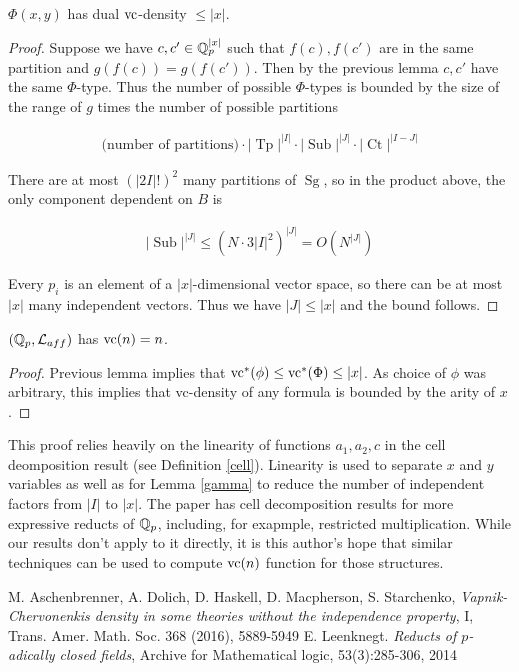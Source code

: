 \documentclass{amsart}
\renewcommand{\LL}{\mathcal L}
\newcommand{\paren}[1]{\left(#1\right)}
\DeclareMathOperator{\Sg}{Sg}
\DeclareMathOperator{\It}{Tp}
\DeclareMathOperator{\Sub}{Sub}
\DeclareMathOperator{\Ct}{Ct}
\begin{document}
\begin{Corollary}
  $\Phi(x,y)$ has dual $\operatorname{vc}$-density $\leq |x|$.
\end{Corollary}

\begin{proof}
  Suppose we have $c, c' \in \mathbb{Q}_p^{|x|}$ such that $f(c), f(c')$ are in the same partition and $g(f(c)) = g(f(c'))$.
  Then by the previous lemma $c, c'$ have the same $\Phi$-type.
  Thus the number of possible $\Phi$-types is bounded by the size of the range of $g$ times the number of possible partitions
  
  \begin{align*}
    \text{(number of partitions)} \cdot |\It|^{|I|} \cdot |\Sub|^{|J|} \cdot |\Ct|^{|I-J|}
  \end{align*}

  There are at most $\paren{|2I|!}^2$ many partitions of $\Sg$,
  so in the product above, the only component dependent on $B$ is

  \begin{align*}
    |\Sub|^{|J|} \leq (N \cdot 3{|I|}^2)^{|J|} = O(N^{|J|})
  \end{align*}	
  
  Every $p_i$ is an element of a $|x|$-dimensional vector space, so there can be at most $|x|$ many independent vectors.
  Thus we have $|J| \leq |x|$ and the bound follows.
\end{proof}

\begin{Corollary} 
  $(\Q_p, \LL_{aff})$ has $\operatorname{vc}(n) = n$.
\end{Corollary}

\begin{proof}
  Previous lemma implies that $\operatorname{vc}^*(\phi) \leq \operatorname{vc}^*(\Phi) \leq |x|$.
  As choice of $\phi$ was arbitrary, this implies that vc-density of any formula is bounded by the arity of $x$.
\end{proof}

This proof relies heavily on the linearity of functions $a_1, a_2, c$ in the cell deomposition result (see Definition \ref{cell}).
Linearity is used to separate $x$ and $y$ variables as well as
for Lemma \ref{gamma} to reduce the number of independent factors from $|I|$ to $|x|$.
The paper \cite{reduct} has cell decomposition results for more expressive reducts of $\mathbb{Q}_p$,
including, for exapmple, restricted multiplication.
While our results don't apply to it directly,
it is this author's hope that similar techniques can be used to compute $\operatorname{vc}(n)$ function for those structures.

\begin{thebibliography}{9}
  M. Aschenbrenner, A. Dolich, D. Haskell, D. Macpherson, S. Starchenko,
  \textit{Vapnik-Chervonenkis density in some theories without the independence property}, I,
  Trans. Amer. Math. Soc. 368 (2016), 5889-5949
  E. Leenknegt. \textit{Reducts of $p$-adically closed fields}, Archive for Mathematical logic, 53(3):285-306, 2014
\end{thebibliography}
\end{document}
